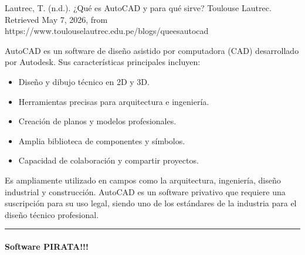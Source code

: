 \documentclass[letterpaper,10pt,spanish]{sphinxmanual}
\begin{document}
\sphinxAtStartPar
%
\begin{footnote}[14]\sphinxAtStartFootnote
Lautrec, T. (n.d.). ¿Qué es AutoCAD y para qué sirve? Toulouse Lautrec. Retrieved May 7, 2026, from https://www.toulouselautrec.edu.pe/blogs/que\sphinxhyphen{}es\sphinxhyphen{}autocad
%
\end{footnote} AutoCAD es un software de diseño asistido por computadora (CAD) desarrollado por Autodesk. Sus características principales incluyen:
\begin{itemize}
\item {} 
\sphinxAtStartPar
Diseño y dibujo técnico en 2D y 3D.

\item {} 
\sphinxAtStartPar
Herramientas precisas para arquitectura e ingeniería.

\item {} 
\sphinxAtStartPar
Creación de planos y modelos profesionales.

\item {} 
\sphinxAtStartPar
Amplia biblioteca de componentes y símbolos.

\item {} 
\sphinxAtStartPar
Capacidad de colaboración y compartir proyectos.

\end{itemize}

\sphinxAtStartPar
Es ampliamente utilizado en campos como la arquitectura, ingeniería, diseño industrial y construcción. AutoCAD es un software privativo que requiere una suscripción para su uso legal, siendo uno de los estándares de la industria para el diseño técnico profesional.


\bigskip\hrule\bigskip



\paragraph{Software PIRATA!!!}
\label{\detokenize{cursos/ofimatica10/recursos/T02:software-pirata}}\begin{quote}

\sphinxAtStartPar
{}
\end{quote}
\end{document}
